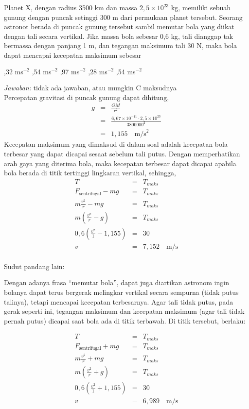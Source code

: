 \documentclass[11pt,fleqn]{exam}
\begin{document}
\begin{questions}
\question Planet X, dengan radius 3500 km dan massa $2,5 \times 10^{23}$ kg, memiliki sebuah gunung dengan puncak setinggi 300 m dari permukaan planet tersebut. Seorang astronot berada di puncak gunung tersebut sambil memutar bola yang diikat dengan tali secara vertikal. Jika massa bola sebesar 0,6 kg, tali dianggap tak bermassa dengan panjang 1 m, dan tegangan maksimum tali 30 N, maka bola dapat mencapai kecepatan maksimum sebesar
\begin{choices}
,32 ms$^{-2}$
,54 ms$^{-2}$
,97 ms$^{-2}$
,28 ms$^{-2}$
,54 ms$^{-2}$
\end{choices}

\textit{Jawaban: } tidak ada jawaban, atau mungkin C maksudnya\\

Percepatan gravitasi di puncak gunung dapat dihitung,
\begin{eqnarray*}
g &=& \frac{GM}{r^2}\\
&=& \frac{6,67 \times 10^{-11} \cdot 2,5 \times 10^{23}}{3800000^2}\\
&=& 1,155 \quad \text{m/s}^2
\end{eqnarray*}
Kecepatan maksimum yang dimaksud di dalam soal adalah kecepatan bola terbesar yang dapat dicapai sesaat sebelum tali putus. Dengan memperhatikan arah gaya yang diterima bola, maka kecepatan terbesar dapat dicapai apabila bola berada di titik tertinggi lingkaran vertikal, sehingga,
\begin{eqnarray*}
T &=& T_{maks}\\
F_{\text{sentrifugal}} - mg &=& T_{maks}\\
m \frac{v^2}{r} - mg &=& T_{maks}\\
m (\frac{v^2}{r} - g) &=& T_{maks}\\
0,6 (\frac{v^2}{1} - 1,155) &=& 30\\
v &=& 7,152 \quad \text{m/s}\\
\end{eqnarray*}

Sudut pandang lain:

Dengan adanya frasa ``memutar bola'', dapat juga diartikan astronom ingin bolanya dapat terus bergerak melingkar vertikal secara sempurna (tidak putus talinya), tetapi mencapai kecepatan terbesarnya. Agar tali tidak putus, pada gerak seperti ini, tegangan maksimum dan kecepatan maksimum (agar tali tidak pernah putus) dicapai saat bola ada di titik terbawah. Di titik tersebut, berlaku:

\begin{eqnarray*}
T &=& T_{maks}\\
F_{\text{sentrifugal}} + mg &=& T_{maks}\\
m \frac{v^2}{r} + mg &=& T_{maks}\\
m (\frac{v^2}{r} + g) &=& T_{maks}\\
0,6 (\frac{v^2}{1} + 1,155) &=& 30\\
v &=& 6,989 \quad \text{m/s}\\
\end{eqnarray*}



\end{questions}
\end{document}
